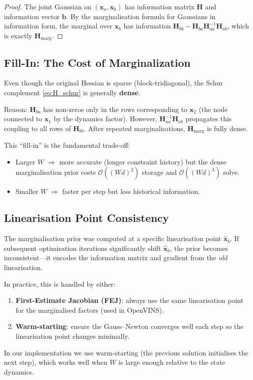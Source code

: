 \documentclass[11pt,a4paper]{article}
\newcommand{\bx}{\bm{x}}
\newcommand{\bb}{\bm{b}}
\newcommand{\bH}{\bm{H}}
\theoremstyle{definition}
\theoremstyle{plain}
\begin{document}
\begin{proof}
  The joint Gaussian on $(\bx_a, \bx_b)$ has information matrix $\bH$
  and information vector $\bb$.  By the marginalisation formula for
  Gaussians in information form, the marginal over $\bx_b$ has
  information $\bH_{bb} - \bH_{ba}\bH_{aa}^{-1}\bH_{ab}$, which is
  exactly $\bH_{\text{marg}}$.
\end{proof}

\subsection{Fill-In: The Cost of Marginalization}

\begin{warnbox}
  Even though the original Hessian is sparse (block-tridiagonal), the Schur
  complement \eqref{eq:H_schur} is generally \textbf{dense}.

  Reason: $\bH_{ba}$ has non-zeros only in the rows corresponding to $\bx_2$ (the
  node connected to $\bx_1$ by the dynamics factor).  However,
  $\bH_{aa}^{-1}\bH_{ab}$ propagates this coupling to all rows of $\bH_{bb}$.
  After repeated marginalisations, $\bH_{\text{marg}}$ is fully dense.
\end{warnbox}

This ``fill-in'' is the fundamental trade-off:
\begin{itemize}
  \item Larger $W$ $\Rightarrow$ more accurate (longer constraint history)
    but the dense marginalisation prior costs $\mathcal{O}((Wd)^2)$ storage
    and $\mathcal{O}((Wd)^3)$ solve.
  \item Smaller $W$ $\Rightarrow$ faster per step but less historical
    information.
\end{itemize}

\subsection{Linearisation Point Consistency}

\begin{warnbox}
  The marginalisation prior was computed at a specific linearisation point
  $\hat{\bx}_b$.  If subsequent optimisation iterations significantly shift
  $\hat{\bx}_b$, the prior becomes inconsistent—it encodes the information
  matrix and gradient from the \emph{old} linearisation.

  In practice, this is handled by either:
  \begin{enumerate}
    \item \textbf{First-Estimate Jacobian (FEJ)}: always use the same
      linearisation point for the marginalised factors (used in OpenVINS).
    \item \textbf{Warm-starting}: ensure the Gauss--Newton converges well
      each step so the linearisation point changes minimally.
  \end{enumerate}

  In our implementation we use warm-starting (the previous solution initialises
  the next step), which works well when $W$ is large enough relative to the
  state dynamics.
\end{warnbox}
\end{document}
